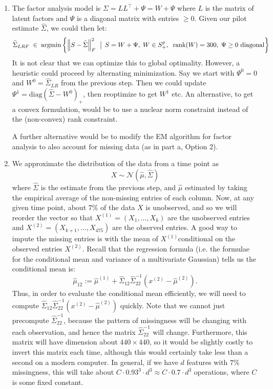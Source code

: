 \begin{enumerate}[label=(\alph*)]
\item
  The factor analysis model is $\Sigma = LL^\top + \Psi = W + \Psi$ where $L$ is the matrix of latent factors and $\Psi$ is a diagonal matrix with entries $\geq 0$. Given our pilot estimate $\widehat{\Sigma}$, we could then let:
  $$ \widehat{\Sigma}_{LRF} \; \in \; \operatorname*{argmin} \left\{ \left\lVert S-\widehat{\Sigma}\right\rVert_F^2 \; \,\big|\, \; S = W + \Psi,\; W \in S^p_+,\;\; \text{rank}(W) = 300,\; \Psi \geq 0 \text{ diagonal}\right\}$$
It is not clear that we can optimize this to global optimality. However, a heuristic could proceed by alternating minimization. Say we start with $\Psi^0 = 0$ and $W^0 = \widehat{\Sigma}_{LR}$ from the previous step. Then we could update $\Psi^1 = \text{diag}(\widehat{\Sigma} - W^0)_+$, then reoptimize to get $W^1$ etc. An alternative, to get a convex formulation, would be to use a nuclear norm constraint instead of the (non-convex) rank constraint. 

  A further alternative would be to modify the EM algorithm for factor analysis to also account for missing data (as in part a, Option 2).

\item
  We approximate the distribution of the data from a time point as
  \begin{equation*}
    X \sim \mathcal{N}(\hat{\mu}, \hat{\Sigma})
  \end{equation*}
  where $\hat{\Sigma}$ is the estimate from the previous step, and $\hat{\mu}$ estimated by taking the empirical average of the non-missing entries of each column. Now, at any given time point, about $7\%$ of the data $X$ is unobserved, and so we will reorder the vector so that $X^{(1)} = (X_1,\dots,X_k)$ are the unobserved entries and $X^{(2)} = (X_{k+1},\dots,X_{475})$ are the observed entries. A good way to impute the missing entries is with the mean of $X^{(1)}$conditional on the observed entries $X^{(2)}$. Recall that the regression formula (i.e. the formulae for the conditional mean and variance of a multivariate Gaussian) tells us the conditional mean is:
  \begin{equation*}
    \hat{\mu}_{1\dot2} := \hat{\mu}^{(1)} + \hat{\Sigma}_{12} \hat{\Sigma}_{22}^{-1} (x^{(2)} - \hat{\mu}^{(2)}).
  \end{equation*}
  Thus, in order to evaluate the conditional mean efficiently, we will need to compute $\hat{\Sigma}_{12} \hat{\Sigma}_{22}^{-1} (x^{(2)} - \hat{\mu}^{(2)})$ quickly. Note that we cannot just precompute $\hat{\Sigma}_{22}^{-1}$, because the pattern of missingness will be changing with each observation, and hence the matrix $\hat{\Sigma}_{22}^{-1}$ will change. Furthermore, this matrix will have dimension about $440 \times 440$, so it would be slightly costly to invert this matrix each time, although this would certainly take less than a second on a modern computer. In general, if we have $d$ features with $7\%$ missingness, this will take about $C \cdot 0.93^3 \cdot d^3 \approx  C \cdot 0.7 \cdot d^3$ operations, where $C$ is some fixed constant.


\end{enumerate}
